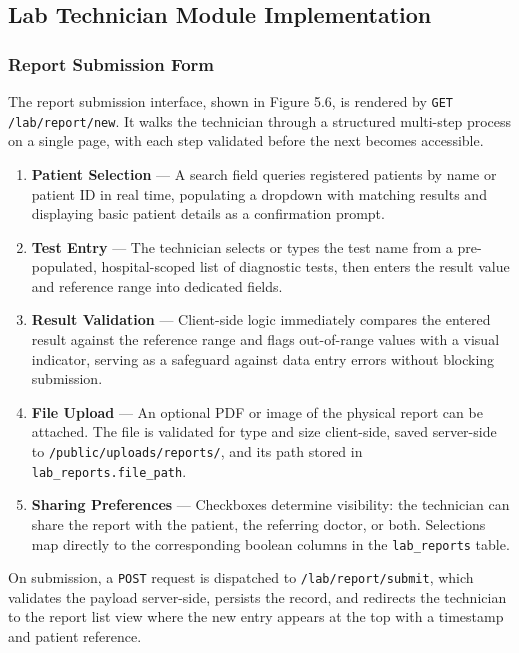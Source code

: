 \subsection{Lab Technician Module Implementation}

\subsubsection{Report Submission Form}

The report submission interface, shown in Figure 5.6, is rendered by \texttt{GET /lab/report/new}. It walks the technician through a structured multi-step process on a single page, with each step validated before the next becomes accessible.

\begin{enumerate}
    \item \textbf{Patient Selection} — A search field queries registered patients by name or patient ID in real time, populating a dropdown with matching results and displaying basic patient details as a confirmation prompt.

    \item \textbf{Test Entry} — The technician selects or types the test name from a pre-populated, hospital-scoped list of diagnostic tests, then enters the result value and reference range into dedicated fields.

    \item \textbf{Result Validation} — Client-side logic immediately compares the entered result against the reference range and flags out-of-range values with a visual indicator, serving as a safeguard against data entry errors without blocking submission.

    \item \textbf{File Upload} — An optional PDF or image of the physical report can be attached. The file is validated for type and size client-side, saved server-side to \texttt{/public/uploads/reports/}, and its path stored in \texttt{lab\_reports.file\_path}.

    \item \textbf{Sharing Preferences} — Checkboxes determine visibility: the technician can share the report with the patient, the referring doctor, or both. Selections map directly to the corresponding boolean columns in the \texttt{lab\_reports} table.
\end{enumerate}

On submission, a \texttt{POST} request is dispatched to \texttt{/lab/report/submit}, which validates the payload server-side, persists the record, and redirects the technician to the report list view where the new entry appears at the top with a timestamp and patient reference.

